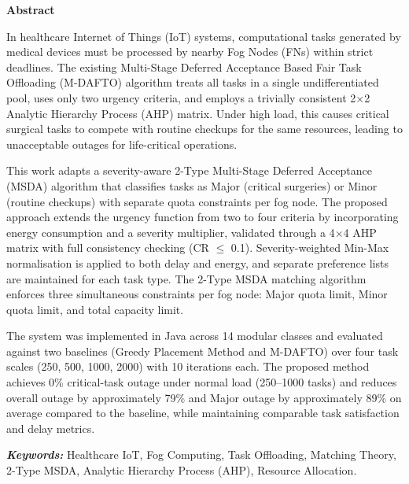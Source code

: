 \documentclass[12pt,phd,times]{pkmthesis}
\begin{document}
\thispagestyle{empty}
{\renewcommand{\baselinestretch}{1.5}
\begin{center}
    {\LARGE \bf Abstract}
\end{center}
{\em{\noindent In healthcare Internet of Things (IoT) systems, computational tasks generated by medical devices must be processed by nearby Fog Nodes (FNs) within strict deadlines. The existing Multi-Stage Deferred Acceptance Based Fair Task Offloading (M-DAFTO) algorithm treats all tasks in a single undifferentiated pool, uses only two urgency criteria, and employs a trivially consistent 2$\times$2 Analytic Hierarchy Process (AHP) matrix. Under high load, this causes critical surgical tasks to compete with routine checkups for the same resources, leading to unacceptable outages for life-critical operations.

This work adapts a severity-aware 2-Type Multi-Stage Deferred Acceptance (MSDA) algorithm that classifies tasks as Major (critical surgeries) or Minor (routine checkups) with separate quota constraints per fog node. The proposed approach extends the urgency function from two to four criteria by incorporating energy consumption and a severity multiplier, validated through a 4$\times$4 AHP matrix with full consistency checking (CR $\leq$ 0.1). Severity-weighted Min-Max normalisation is applied to both delay and energy, and separate preference lists are maintained for each task type. The 2-Type MSDA matching algorithm enforces three simultaneous constraints per fog node: Major quota limit, Minor quota limit, and total capacity limit.

The system was implemented in Java across 14 modular classes and evaluated against two baselines (Greedy Placement Method and M-DAFTO) over four task scales (250, 500, 1000, 2000) with 10 iterations each. The proposed method achieves 0\% critical-task outage under normal load (250--1000 tasks) and reduces overall outage by approximately 79\% and Major outage by approximately 89\% on average compared to the baseline, while maintaining comparable task satisfaction and delay metrics.

\vspace{0.4cm}
\noindent \textbf{\em Keywords:} Healthcare IoT, Fog Computing, Task Offloading, Matching Theory, 2-Type MSDA, Analytic Hierarchy Process (AHP), Resource Allocation.}}}
\thispagestyle{empty}
\clearpage
\end{document}
